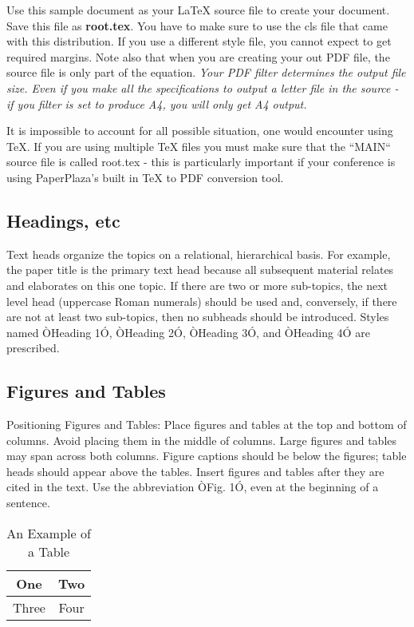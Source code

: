 \documentclass[letterpaper, 10 pt, conference]{ieeeconf}  %
\begin{document}
Use this sample document as your LaTeX source file to create your document. Save this file as {\bf root.tex}. You have to make sure to use the cls file that came with this distribution. If you use a different style file, you cannot expect to get required margins. Note also that when you are creating your out PDF file, the source file is only part of the equation. {\it Your PDF filter determines the output file size. Even if you make all the specifications to output a letter file in the source - if you filter is set to produce A4, you will only get A4 output. }

It is impossible to account for all possible situation, one would encounter using TeX. If you are using multiple TeX files you must make sure that the ``MAIN`` source file is called root.tex - this is particularly important if your conference is using PaperPlaza's built in TeX to PDF conversion tool.

\subsection{Headings, etc}

Text heads organize the topics on a relational, hierarchical basis. For example, the paper title is the primary text head because all subsequent material relates and elaborates on this one topic. If there are two or more sub-topics, the next level head (uppercase Roman numerals) should be used and, conversely, if there are not at least two sub-topics, then no subheads should be introduced. Styles named ÒHeading 1Ó, ÒHeading 2Ó, ÒHeading 3Ó, and ÒHeading 4Ó are prescribed.

\subsection{Figures and Tables}

Positioning Figures and Tables: Place figures and tables at the top and bottom of columns. Avoid placing them in the middle of columns. Large figures and tables may span across both columns. Figure captions should be below the figures; table heads should appear above the tables. Insert figures and tables after they are cited in the text. Use the abbreviation ÒFig. 1Ó, even at the beginning of a sentence.

\begin{table}[h]
\caption{An Example of a Table}
\label{table_example}
\begin{center}
\begin{tabular}{|c||c|}
\hline
One & Two\\
\hline
Three & Four\\
\hline
\end{tabular}
\end{center}
\end{table}
\end{document}
